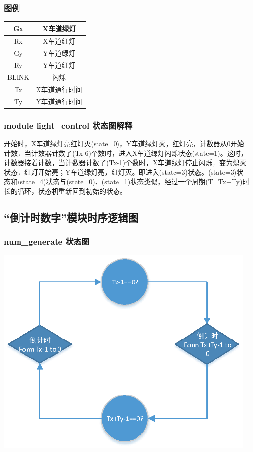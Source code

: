 \documentclass[12pt,a4paper]{article}
\begin{document}
	\subsubsection{图例}	
	\begin{center}
			\begin{tabular}{|c|c|}
			\hline Gx & X车道绿灯 \\ 
			\hline Rx & X车道红灯 \\ 
			\hline Gy & Y车道绿灯 \\ 
			\hline Ry & Y车道红灯 \\ 
			\hline BLINK & 闪烁 \\ 
			\hline Tx & X车道通行时间 \\ 
			\hline Ty & Y车道通行时间 \\ 
			\hline 
		\end{tabular}
	\end{center} 
	
	\subsubsection{module light\_control 状态图解释}		
	开始时，X车道绿灯亮红灯灭(state=0)，Y车道绿灯灭，红灯亮，计数器从0开始计数，当计数器计数了(Tx-6)个数时，进入X车道绿灯闪烁状态(state=1)。这时，计数器接着计数，当计数器计数了(Tx-1)个数时，X车道绿灯停止闪烁，变为熄灭状态，红灯开始亮；Y车道绿灯亮，红灯灭。即进入(state=3)状态。(state=3)状态和(state=4)状态与(state=0)、(state=1)状态类似，经过一个周期(T=Tx+Ty)时长的循环，状态机重新回到初始的状态。
	
	\subsection{“倒计时数字”模块时序逻辑图}
		\subsubsection{num\_generate 状态图}
		\begin{center}
		\includegraphics[width=13cm]{pic/num.eps}
		\end{center}
\end{document}

